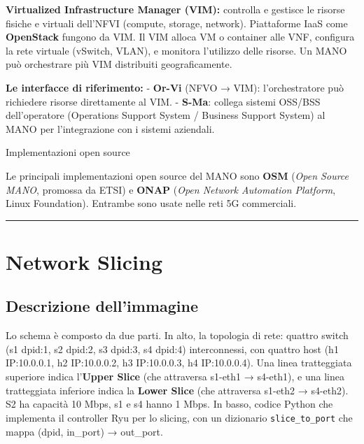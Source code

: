 \documentclass[
  italian,
  openany]{book}
\begin{document}
\textbf{Virtualized Infrastructure Manager (VIM):} controlla e gestisce
le risorse fisiche e virtuali dell'NFVI (compute, storage, network).
Piattaforme IaaS come \textbf{OpenStack} fungono da VIM. Il VIM alloca
VM o container alle VNF, configura la rete virtuale (vSwitch, VLAN), e
monitora l'utilizzo delle risorse. Un MANO può orchestrare più VIM
distribuiti geograficamente.

\textbf{Le interfacce di riferimento:} - \textbf{Or-Vi} (NFVO → VIM):
l'orchestratore può richiedere risorse direttamente al VIM. -
\textbf{S-Ma}: collega sistemi OSS/BSS dell'operatore (Operations
Support System / Business Support System) al MANO per l'integrazione con
i sistemi aziendali.

\begin{calloutnote}{Implementazioni open source}

Le principali implementazioni open source del MANO sono \textbf{OSM}
(\emph{Open Source MANO}, promossa da ETSI) e \textbf{ONAP} (\emph{Open
Network Automation Platform}, Linux Foundation). Entrambe sono usate
nelle reti 5G commerciali.

\end{calloutnote}

\begin{center}\rule{0.5\linewidth}{0.5pt}\end{center}

\section{Network Slicing}\label{network-slicing}

\subsection{Descrizione
dell'immagine}\label{descrizione-dellimmagine-13}

Lo schema è composto da due parti. In alto, la topologia di rete:
quattro switch (s1 dpid:1, s2 dpid:2, s3 dpid:3, s4 dpid:4)
interconnessi, con quattro host (h1 IP:10.0.0.1, h2 IP:10.0.0.2, h3
IP:10.0.0.3, h4 IP:10.0.0.4). Una linea tratteggiata superiore indica
l'\textbf{Upper Slice} (che attraversa s1-eth1 → s4-eth1), e una linea
tratteggiata inferiore indica la \textbf{Lower Slice} (che attraversa
s1-eth2 → s4-eth2). S2 ha capacità 10 Mbps, s1 e s4 hanno 1 Mbps. In
basso, codice Python che implementa il controller Ryu per lo slicing,
con un dizionario \texttt{slice\_to\_port} che mappa (dpid, in\_port) →
out\_port.
\end{document}
